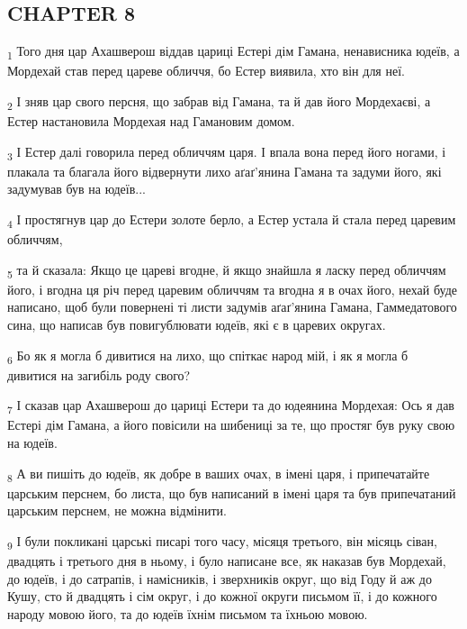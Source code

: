 \subsection{CHAPTER 8}
\begin{tcolorbox}
\textsubscript{1} Того дня цар Ахашверош віддав цариці Естері дім Гамана, ненависника юдеїв, а Мордехай став перед цареве обличчя, бо Естер виявила, хто він для неї.
\end{tcolorbox}
\begin{tcolorbox}
\textsubscript{2} І зняв цар свого персня, що забрав від Гамана, та й дав його Мордехаєві, а Естер настановила Мордехая над Гамановим домом.
\end{tcolorbox}
\begin{tcolorbox}
\textsubscript{3} І Естер далі говорила перед обличчям царя. І впала вона перед його ногами, і плакала та благала його відвернути лихо аґаґ'янина Гамана та задуми його, які задумував був на юдеїв...
\end{tcolorbox}
\begin{tcolorbox}
\textsubscript{4} І простягнув цар до Естери золоте берло, а Естер устала й стала перед царевим обличчям,
\end{tcolorbox}
\begin{tcolorbox}
\textsubscript{5} та й сказала: Якщо це цареві вгодне, й якщо знайшла я ласку перед обличчям його, і вгодна ця річ перед царевим обличчям та вгодна я в очах його, нехай буде написано, щоб були повернені ті листи задумів аґаґ'янина Гамана, Гаммедатового сина, що написав був повигублювати юдеїв, які є в царевих округах.
\end{tcolorbox}
\begin{tcolorbox}
\textsubscript{6} Бо як я могла б дивитися на лихо, що спіткає народ мій, і як я могла б дивитися на загибіль роду свого?
\end{tcolorbox}
\begin{tcolorbox}
\textsubscript{7} І сказав цар Ахашверош до цариці Естери та до юдеянина Мордехая: Ось я дав Естері дім Гамана, а його повісили на шибениці за те, що простяг був руку свою на юдеїв.
\end{tcolorbox}
\begin{tcolorbox}
\textsubscript{8} А ви пишіть до юдеїв, як добре в ваших очах, в імені царя, і припечатайте царським перснем, бо листа, що був написаний в імені царя та був припечатаний царським перснем, не можна відмінити.
\end{tcolorbox}
\begin{tcolorbox}
\textsubscript{9} І були покликані царські писарі того часу, місяця третього, він місяць сіван, двадцять і третього дня в ньому, і було написане все, як наказав був Мордехай, до юдеїв, і до сатрапів, і намісників, і зверхників округ, що від Году й аж до Кушу, сто й двадцять і сім округ, і до кожної округи письмом її, і до кожного народу мовою його, та до юдеїв їхнім письмом та їхньою мовою.
\end{tcolorbox}
